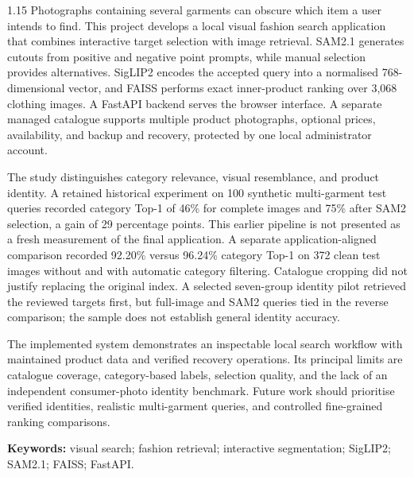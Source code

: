 \begin{spacing}{1.15}
Photographs containing several garments can obscure which item a user intends
to find. This project develops a local visual fashion search application that
combines interactive target selection with image retrieval. SAM2.1 generates
cutouts from positive and negative point prompts, while manual selection provides
alternatives. SigLIP2 encodes the accepted query into a normalised 768-dimensional
vector, and FAISS performs exact inner-product ranking over 3,068 clothing images.
A FastAPI backend serves the browser interface. A separate managed catalogue
supports multiple product photographs, optional prices, availability, and backup
and recovery, protected by one local administrator account.

The study distinguishes category relevance, visual resemblance, and product
identity. A retained historical experiment on 100 synthetic multi-garment test
queries recorded category Top-1 of 46\% for complete images and 75\% after SAM2
selection, a gain of 29 percentage points. This earlier pipeline is not presented
as a fresh measurement of the final application. A separate application-aligned
comparison recorded 92.20\% versus 96.24\% category Top-1 on 372 clean test images
without and with automatic category filtering. Catalogue cropping did not justify
replacing the original index. A selected seven-group identity pilot retrieved
the reviewed targets first, but full-image and SAM2 queries tied in the reverse
comparison; the sample does not establish general identity accuracy.

The implemented system demonstrates an inspectable local search workflow with
maintained product data and verified recovery operations. Its principal limits
are catalogue coverage, category-based labels, selection quality, and the lack
of an independent consumer-photo identity benchmark. Future work should
prioritise verified identities, realistic multi-garment queries, and controlled
fine-grained ranking comparisons.

\vspace{0.6em}
\noindent\textbf{Keywords:} visual search; fashion retrieval; interactive
segmentation; SigLIP2; SAM2.1; FAISS; FastAPI.
\end{spacing}
\clearpage
